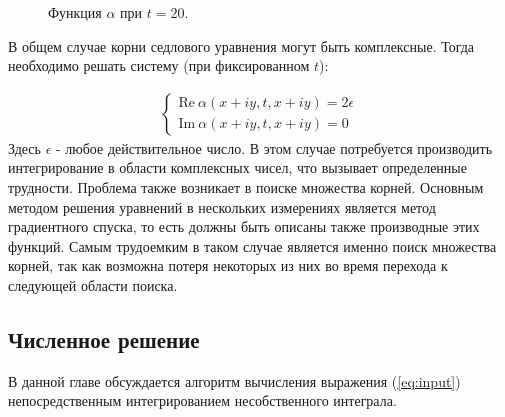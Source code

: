 \documentclass[14pt, a4paper]{article}
\numberwithin{figure}{section}
\numberwithin{equation}{section}
\newcommand{\sectionbreak}{\clearpage}
\renewcommand{\Re}{\mathrm{Re}}
\renewcommand{\Im}{\mathrm{Im}}
\begin{document}
\begin{figure}[h]
	\caption{Функция $\alpha$ при $t = 20$.}
	\label{ris:alpha-20..20}
\end{figure}


В общем случае корни седлового уравнения могут быть комплексные. Тогда необходимо решать систему (при фиксированном $t$):

\begin{eqnarray}
\begin{cases}
\Re \ \alpha(x+i y, t, x+i y) = 2\epsilon \nonumber\\
\Im \ \alpha(x+i y, t, x+i y) = 0 \nonumber
\end{cases}
\end{eqnarray}
Здесь $\epsilon$ - любое действительное число. В этом случае потребуется производить интегрирование в области комплексных чисел, что вызывает определенные трудности. Проблема также возникает в поиске множества корней. Основным методом решения уравнений в нескольких измерениях является метод градиентного спуска, то есть должны быть описаны также производные этих функций. Самым трудоемким в таком случае является именно поиск множества корней, так как возможна потеря некоторых из них во время перехода к следующей области поиска.

\sectionbreak

\subsection{Численное решение}

В данной главе обсуждается алгоритм вычисления выражения (\ref{eq:input}) непосредственным интегрированием несобственного интеграла.
\end{document}
